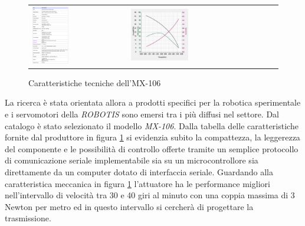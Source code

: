 \documentclass[%
corpo=11pt,
twoside,
 stile=classica,
oldstyle,
greek,%
]{toptesi}
\begin{document}
	\begin{figure}
		\centering
		\begin{tabular}{ll}
			\includegraphics[width=0.4\textwidth]{image/mx160data.png}
			&
			\includegraphics[width=0.4\textwidth]{image/mx160figure.png}
		\end{tabular}
		\caption{Caratteristiche tecniche dell'MX-106 }
		\label{fig:MX160data}
	\end{figure}



	La ricerca è stata orientata allora a prodotti specifici per la robotica sperimentale e i servomotori della \textit{ROBOTIS} sono emersi tra i più diffusi nel settore. Dal catalogo è stato selezionato il modello \textit{MX-106}. 
	Dalla tabella delle caratteristiche fornite dal produttore in figura \ref{fig:MX160data} si evidenzia subito la compattezza, la leggerezza del componente e le possibilità di controllo offerte tramite un semplice protocollo di comunicazione seriale implementabile sia su un microcontrollore sia direttamente da un computer dotato di interfaccia seriale.
	Guardando alla caratteristica meccanica in figura \ref{fig:MX160data} l'attuatore ha le performance migliori nell'intervallo di velocità tra 30 e 40 giri al minuto con una coppia massima di 3 Newton per metro ed in questo intervallo si cercherà di progettare la trasmissione. 
	
\end{document}
